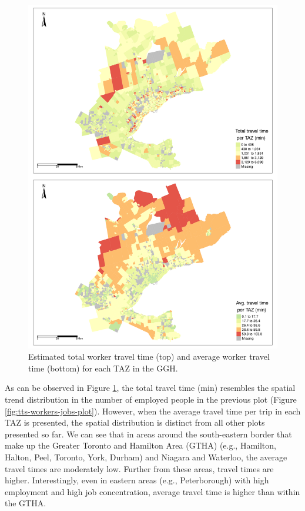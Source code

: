 \documentclass[Royal,times,sageh]{sagej}
\begin{document}
\begin{figure}
\includegraphics[width=1\linewidth]{Manuscript-Data-Package_files/figure-latex/plot-tt-ttpertrip-1} \caption{\label{fig:plot-tt-ttpertrip}Estimated total worker travel time (top) and average worker travel time (bottom) for each TAZ in the GGH.}\label{fig:plot-tt-ttpertrip}
\end{figure}

\newpage

As can be observed in Figure \ref{fig:plot-tt-ttpertrip}, the total
travel time (min) resembles the spatial trend distribution in the number
of employed people in the previous plot (Figure
\ref{fig:tts-workers-jobs-plot}). However, when the average travel time
per trip in each TAZ is presented, the spatial distribution is distinct
from all other plots presented so far. We can see that in areas around
the south-eastern border that make up the Greater Toronto and Hamilton
Area (GTHA) (e.g., Hamilton, Halton, Peel, Toronto, York, Durham) and
Niagara and Waterloo, the average travel times are moderately low.
Further from these areas, travel times are higher. Interestingly, even
in eastern areas (e.g., Peterborough) with high employment and high job
concentration, average travel time is higher than within the GTHA.
\end{document}
